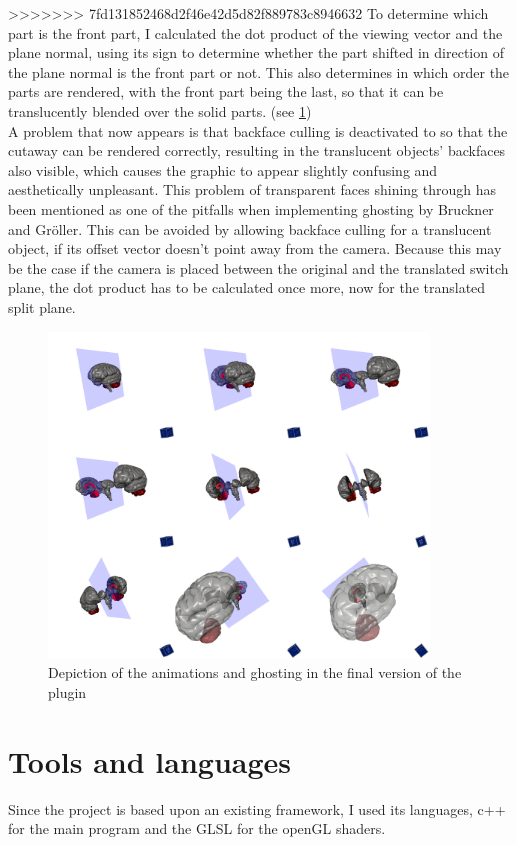>>>>>>> 7fd131852468d2f46e42d5d82f889783c8946632
To determine which part is the front part, I calculated the dot product of the viewing vector and the plane normal, using its sign to determine whether the part shifted in direction of the plane normal is the front part or not. This also determines in which order the parts are rendered, with the front part being the last, so that it can be translucently blended over the solid parts. (see \ref{fig:brainstem})\\
A problem that now appears is that backface culling is deactivated to so that the cutaway can be rendered correctly, resulting in the translucent objects' backfaces also visible, which causes the graphic to appear slightly confusing and aesthetically unpleasant. This problem of transparent faces shining through has been mentioned as one of the pitfalls when implementing ghosting by Bruckner and Gr\"oller\cite{proc:bruckner-2006-EVV}. This can be avoided by allowing backface culling for a translucent object, if its offset vector doesn't point away from the camera. Because this may be the case if the camera is placed between the original and the translated switch plane, the dot product has to be calculated once more, now for the translated split plane.\\
\begin{figure}[tb]
	\centering
	\includegraphics[width=0.9\textwidth]{chapters/figures/brainstem}
	\caption{Depiction of the animations and ghosting in the final version of the plugin}
	\label{fig:brainstem}
\end{figure}
\section {Tools and languages}
Since the project is based upon an existing framework, I used its languages, c++ for the main program and the GLSL for the openGL shaders.
